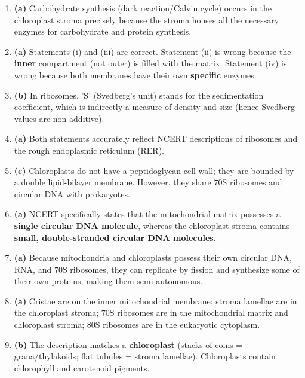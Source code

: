 \documentclass[11pt, a4paper]{article}
\begin{document}
\begin{enumerate}[label=\textbf{\arabic*.}, leftmargin=*, itemsep=6pt]
    \item \textbf{(a)} Carbohydrate synthesis (dark reaction/Calvin cycle) occurs in the chloroplast stroma precisely because the stroma houses all the necessary enzymes for carbohydrate and protein synthesis.

    \item \textbf{(a)} Statements (i) and (iii) are correct. Statement (ii) is wrong because the \textbf{inner} compartment (not outer) is filled with the matrix. Statement (iv) is wrong because both membranes have their own \textbf{specific} enzymes.

    \item \textbf{(b)} In ribosomes, 'S' (Svedberg's unit) stands for the sedimentation coefficient, which is indirectly a measure of density and size (hence Svedberg values are non-additive).

    \item \textbf{(a)} Both statements accurately reflect NCERT descriptions of ribosomes and the rough endoplasmic reticulum (RER).

    \item \textbf{(c)} Chloroplasts do not have a peptidoglycan cell wall; they are bounded by a double lipid-bilayer membrane. However, they share $70\text{S}$ ribosomes and circular DNA with prokaryotes.

    \item \textbf{(a)} NCERT specifically states that the mitochondrial matrix possesses a \textbf{single circular DNA molecule}, whereas the chloroplast stroma contains \textbf{small, double-stranded circular DNA molecules}.

    \item \textbf{(a)} Because mitochondria and chloroplasts possess their own circular DNA, RNA, and $70\text{S}$ ribosomes, they can replicate by fission and synthesize some of their own proteins, making them semi-autonomous.

    \item \textbf{(a)} Cristae are on the inner mitochondrial membrane; stroma lamellae are in the chloroplast stroma; $70\text{S}$ ribosomes are in the mitochondrial matrix and chloroplast stroma; $80\text{S}$ ribosomes are in the eukaryotic cytoplasm.

    \item \textbf{(b)} The description matches a \textbf{chloroplast} (stacks of coins = grana/thylakoids; flat tubules = stroma lamellae). Chloroplasts contain chlorophyll and carotenoid pigments.


\end{enumerate}
\end{document}
